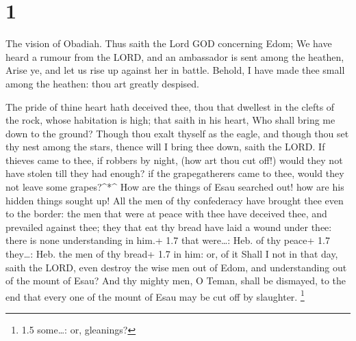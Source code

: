 \hypertarget{section}{%
\section{1}\label{section}}

 The vision of Obadiah. Thus saith the Lord GOD concerning
Edom; We have heard a rumour from the LORD, and an ambassador is sent
among the heathen, Arise ye, and let us rise up against her in battle.
 Behold, I have made thee small among the heathen: thou art
greatly despised.

 The pride of thine heart hath deceived thee, thou that
dwellest in the clefts of the rock, whose habitation is high; that saith
in his heart, Who shall bring me down to the ground?  Though
thou exalt thyself as the eagle, and though thou set thy nest among the
stars, thence will I bring thee down, saith the LORD.  If
thieves came to thee, if robbers by night, (how art thou cut off!) would
they not have stolen till they had enough? if the grapegatherers came to
thee, would they not leave some grapes?\^{}*\^{}  How are
the things of Esau searched out! how are his hidden things sought up!
 All the men of thy confederacy have brought thee even to
the border: the men that were at peace with thee have deceived thee, and
prevailed against thee; they that eat thy bread have laid a wound under
thee: there is none understanding in him.+ 1.7 that were\ldots: Heb. of
thy peace+ 1.7 they\ldots: Heb. the men of thy bread+ 1.7 in him: or, of
it  Shall I not in that day, saith the LORD, even destroy
the wise men out of Edom, and understanding out of the mount of Esau?
 And thy mighty men, O Teman, shall be dismayed, to the end
that every one of the mount of Esau may be cut off by slaughter.
\footnote{1.5 some\ldots: or, gleanings?}

